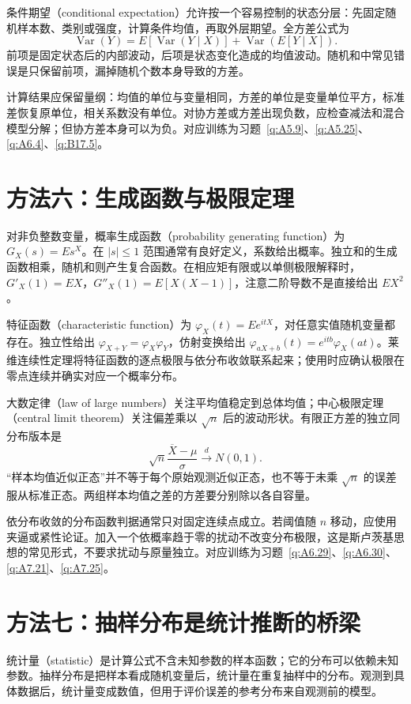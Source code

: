 \documentclass[12pt,fontset=fandol]{ctexart}
\begin{document}
条件期望（conditional expectation）允许按一个容易控制的状态分层：先固定随机样本数、类别或强度，计算条件均值，再取外层期望。全方差公式为
\[
\operatorname{Var}(Y)=E[\operatorname{Var}(Y\mid X)]+\operatorname{Var}(E[Y\mid X]).
\]
前项是固定状态后的内部波动，后项是状态变化造成的均值波动。随机和中常见错误是只保留前项，漏掉随机个数本身导致的方差。

计算结果应保留量纲：均值的单位与变量相同，方差的单位是变量单位平方，标准差恢复原单位，相关系数没有单位。对协方差或方差出现负数，应检查减法和混合模型分解；但协方差本身可以为负。对应训练为习题~\ref{q:A5.9}、\ref{q:A5.25}、\ref{q:A6.4}、\ref{q:B17.5}。

\section*{方法六：生成函数与极限定理}
对非负整数变量，概率生成函数（probability generating function）为 $G_X(s)=Es^X$。在 $|s|\le1$ 范围通常有良好定义，系数给出概率。独立和的生成函数相乘，随机和则产生复合函数。在相应矩有限或以单侧极限解释时，$G'_X(1)=EX$，$G''_X(1)=E[X(X-1)]$，注意二阶导数不是直接给出 $EX^2$。

特征函数（characteristic function）为 $\varphi_X(t)=Ee^{itX}$，对任意实值随机变量都存在。独立性给出 $\varphi_{X+Y}=\varphi_X\varphi_Y$，仿射变换给出 $\varphi_{aX+b}(t)=e^{itb}\varphi_X(at)$。莱维连续性定理将特征函数的逐点极限与依分布收敛联系起来；使用时应确认极限在零点连续并确实对应一个概率分布。

大数定律（law of large numbers）关注平均值稳定到总体均值；中心极限定理（central limit theorem）关注偏差乘以 $\sqrt n$ 后的波动形状。有限正方差的独立同分布版本是
\[
\sqrt n\frac{\overline X-\mu}{\sigma}\xrightarrow dN(0,1).
\]
“样本均值近似正态”并不等于每个原始观测近似正态，也不等于未乘 $\sqrt n$ 的误差服从标准正态。两组样本均值之差的方差要分别除以各自容量。

依分布收敛的分布函数判据通常只对固定连续点成立。若阈值随 $n$ 移动，应使用夹逼或紧性论证。加入一个依概率趋于零的扰动不改变分布极限，这是斯卢茨基思想的常见形式，不要求扰动与原量独立。对应训练为习题~\ref{q:A6.29}、\ref{q:A6.30}、\ref{q:A7.21}、\ref{q:A7.25}。

\section*{方法七：抽样分布是统计推断的桥梁}
统计量（statistic）是计算公式不含未知参数的样本函数；它的分布可以依赖未知参数。抽样分布是把样本看成随机变量后，统计量在重复抽样中的分布。观测到具体数据后，统计量变成数值，但用于评价误差的参考分布来自观测前的模型。
\end{document}
